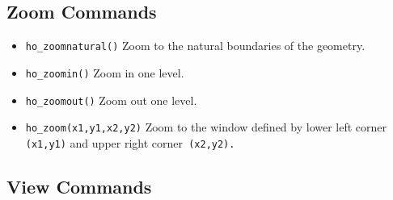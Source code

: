 \subsection{Zoom Commands}

\begin{itemize}
\item \texttt{ho\_zoomnatural()} Zoom to the natural boundaries of the geometry.

\item \texttt{ho\_zoomin()} Zoom in one level.

\item \texttt{ho\_zoomout()} Zoom out one level.

\item \texttt{ho\_zoom(x1,y1,x2,y2)} Zoom to the window defined by lower left corner
\texttt{(x1,y1)} and upper right corner\texttt{ (x2,y2).}
\end{itemize}



\subsection{View Commands}

